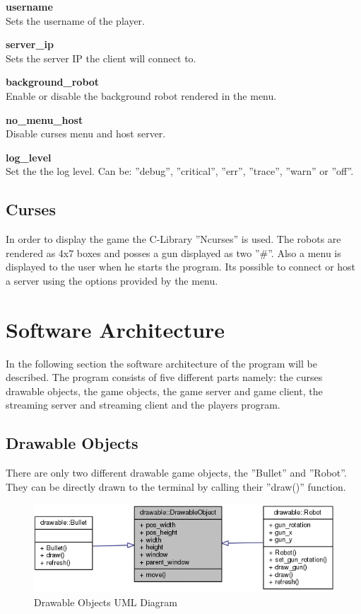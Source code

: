 \documentclass[12pt]{report}
\begin{document}
\textbf{username} \\
Sets the username of the player.

\textbf{server\_ip} \\
Sets the server IP the client will connect to.

\textbf{background\_robot} \\
Enable or disable the background robot rendered in the menu.

\textbf{no\_menu\_host} \\
Disable curses menu and host server.

\textbf{log\_level} \\
Set the the log level. Can be: ''debug'', ''critical'', ''err'', ''trace'', ''warn'' or ''off''.

\subsection{Curses}

In order to display the game the C-Library ''Ncurses'' is used. The robots are rendered as 4x7 boxes and posses a gun displayed as two ''\#''. Also a menu is displayed to the user when he starts the program. Its possible to connect or host a server using the options provided by the menu.

\section{Software Architecture}

In the following section the software architecture of the program will be described. The program consists of five different parts namely: the curses drawable objects, the game objects, the game server and game client, the streaming server and streaming client and the players program.

\subsection{Drawable Objects}
There are only two different drawable game objects, the ''Bullet'' and ''Robot''. They can be directly drawn to the terminal by calling their ''draw()'' function.

\begin{figure}[h]
\centering
\includegraphics[scale = 0.5]{images/DrawableObject_graph.png}
\caption{Drawable Objects UML Diagram}
\medskip
\end{figure}
\end{document}
